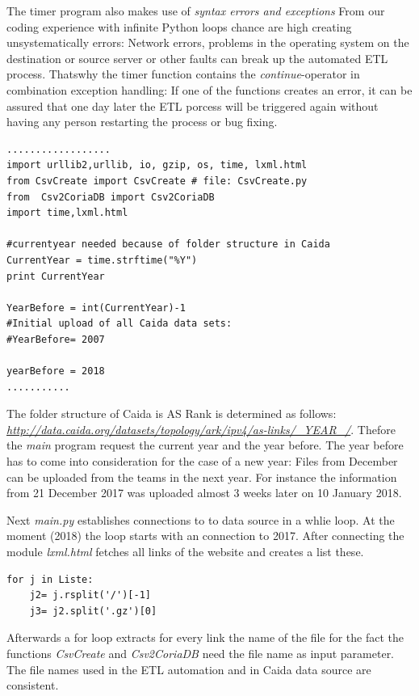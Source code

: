 \documentclass[conference, 11pt]{IEEEtran}
\begin{document}
The timer program also makes use of \textit{syntax errors and exceptions} %
From our coding experience with infinite Python loops chance are high creating unsystematically errors: Network errors, problems in the operating system on the destination or source server or other faults can break up the automated ETL process.
Thatswhy the timer function contains the \textit{continue}-operator in combination exception handling: If one of the functions creates an error, it can be assured that one day later the ETL porcess will be triggered again without having any person restarting the process or bug fixing.
\linebreak
\linebreak
\linebreak

\begin{lstlisting}
..................
import urllib2,urllib, io, gzip, os, time, lxml.html
from CsvCreate import CsvCreate # file: CsvCreate.py
from  Csv2CoriaDB import Csv2CoriaDB
import time,lxml.html

#currentyear needed because of folder structure in Caida
CurrentYear = time.strftime("%Y")
print CurrentYear

YearBefore = int(CurrentYear)-1
#Initial upload of all Caida data sets:
#YearBefore= 2007

yearBefore = 2018
...........
\end{lstlisting}

The folder structure of Caida is AS Rank is determined as follows: \textit{\url{http://data.caida.org/datasets/topology/ark/ipv4/as-links/_YEAR_/}}. Thefore the \textit{main} program request the current year and the year before. The year before has to come into consideration for the case of a new year: Files from December can be uploaded from the teams in the next year. For instance the information from 21 December 2017 was uploaded almost 3 weeks later on 10 January 2018.

Next \textit{main.py} establishes connections to to data source in a whlie loop. At the moment (2018) the loop starts with an connection to 2017. After connecting the module \textit{lxml.html} fetches all links of the website and creates a list these.

\begin{lstlisting}
for j in Liste:
	j2= j.rsplit('/')[-1]
	j3= j2.split('.gz')[0]

\end{lstlisting}
Afterwards a for loop extracts for every link the name of the file for the fact the functions \textit{CsvCreate} and \textit{Csv2CoriaDB} need the file name as input parameter. The file names used in the ETL automation and in Caida data source are consistent.
\end{document}
